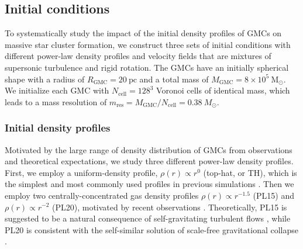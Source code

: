 \documentclass[fleqn,usenatbib]{mnras}
\begin{document}
\subsection{Initial conditions}
\label{sec:initialConditions}

To systematically study the impact of the initial density profiles of GMCs on massive star cluster formation, we construct three sets of initial conditions with different power-law density profiles and velocity fields that are mixtures of supersonic turbulence and rigid rotation.
The GMCs have an initially spherical shape with a radius of $R_{\mathrm{GMC}}=20\ \mathrm{pc}$ and a total mass of $M_{\mathrm{GMC}}=8\times10^5\ \mathrm{M_\odot}$.
We initialize each GMC with $N_{\mathrm{cell}}=128^3$ Voronoi cells of identical mass, which leads to a mass resolution of $m_\mathrm{res}=M_{\mathrm{GMC}}/N_{\mathrm{cell}}=0.38\ M_\odot$.

\subsubsection{Initial density profiles}
\label{sec:initialDensityProfile}

Motivated by the large range of density distribution of GMCs from observations and theoretical expectations, we study three different power-law density profiles.
First, we employ a uniform-density profile, $\rho(r)\propto r^0$ (top-hat, or TH), which is the simplest and most commonly used profiles in previous simulations \citep[e.g.][L19]{ostriker_density_2001, bonnell_hierarchical_2003, padoan_simple_2012, raskutti_numerical_2016, skinner_numerical_2015, mapelli_rotation_2017, grudic_nature_2019, kim_modeling_2019}.
Then we employ two centrally-concentrated gas density profiles $\rho(r)\propto r^{-1.5}$ (PL15) and $\rho(r)\propto r^{-2}$ (PL20), motivated by recent observations \citep[e.g.][]{mueller_physical_2002, pirogov_density_2009, palau_fragmentation_2014, schneider_understanding_2015, wyrowski_infall_2016, csengeri_alma_2017}. Theoretically, PL15 is suggested to be a natural consequence of self-gravitating turbulent flows \citep[e.g.][]{murray_star_2015}, while PL20 is consistent with the self-similar solution of scale-free gravitational collapse \citep[e.g.][]{larson_numerical_1969, penston_dynamics_1969, naranjo-romero_hierarchical_2015, donkov_density_2018, li_scale-free_2018}.
\end{document}
